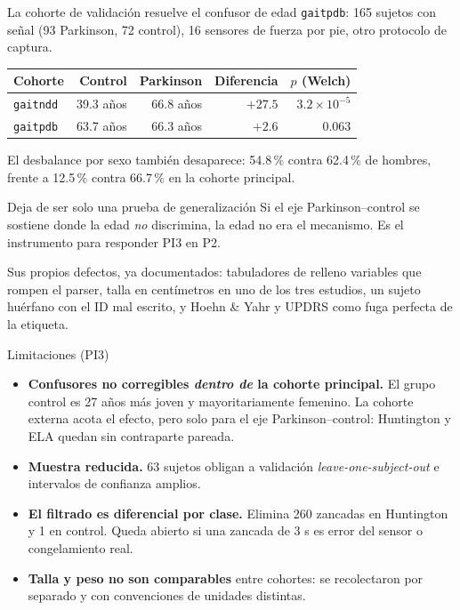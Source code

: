\documentclass[aspectratio=169,10pt]{beamer}
\begin{document}
\begin{frame}{La cohorte de validación resuelve el confusor de edad}
  \texttt{gaitpdb}: 165 sujetos con señal (93 Parkinson, 72 control), 16 sensores de fuerza por pie, otro protocolo de captura.

  \vspace{1em}
  \centering
  \begin{tabular}{lrrrr}
    \toprule
    Cohorte & Control & Parkinson & Diferencia & $p$ (Welch) \\
    \midrule
    \texttt{gaitndd} & 39.3 años & 66.8 años & $+27.5$ & $3.2\times10^{-5}$ \\
    \texttt{gaitpdb} & 63.7 años & 66.3 años & $+2.6$  & $0.063$ \\
    \bottomrule
  \end{tabular}

  \vspace{1.2em}
  \raggedright
  El desbalance por sexo también desaparece: 54.8\,\% contra 62.4\,\% de hombres, frente a 12.5\,\% contra 66.7\,\% en la cohorte principal.

  \vspace{0.8em}
  \begin{block}{Deja de ser solo una prueba de generalización}
    Si el eje Parkinson--control se sostiene donde la edad \emph{no} discrimina, la edad no era el mecanismo. Es el instrumento para responder PI3 en P2.
  \end{block}

  \vspace{0.5em}
  \footnotesize
  Sus propios defectos, ya documentados: tabuladores de relleno variables que rompen el parser, talla en centímetros en uno de los tres estudios, un sujeto huérfano con el ID mal escrito, y Hoehn \& Yahr y UPDRS como fuga perfecta de la etiqueta.
\end{frame}

\begin{frame}{Limitaciones (PI3)}
  \begin{itemize}
    \item \textbf{Confusores no corregibles \emph{dentro de} la cohorte principal.} El grupo control es 27 años más joven y mayoritariamente femenino. La cohorte externa acota el efecto, pero solo para el eje Parkinson--control: Huntington y ELA quedan sin contraparte pareada.
      \vspace{0.6em}
    \item \textbf{Muestra reducida.} 63 sujetos obligan a validación \textit{leave-one-subject-out} e intervalos de confianza amplios.
      \vspace{0.6em}
    \item \textbf{El filtrado es diferencial por clase.} Elimina 260 zancadas en Huntington y 1 en control. Queda abierto si una zancada de 3 s es error del sensor o congelamiento real.
      \vspace{0.6em}
    \item \textbf{Talla y peso no son comparables} entre cohortes: se recolectaron por separado y con convenciones de unidades distintas.
  \end{itemize}
\end{frame}
\end{document}

